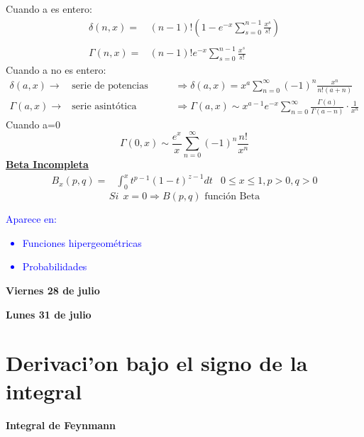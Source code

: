 \documentclass{article}
\theoremstyle{definition}
\begin{document}
Cuando a es entero:
\[
\begin{array}{rl}
	\delta (n,x)=& (n-1)!\left(1-e^{-x}\sum^{n-1}_{s=0}\frac{x^s}{s!}\right)\\
	\\
	\Gamma (n,x)=&(n-1)!e^{-x}\sum^{n-1}_{s=0}\frac{x^s}{s!}
\end{array}
\]
Cuando a no es entero:
\[
\begin{array}{rll}
	\delta (a,x)\rightarrow & \text{serie de potencias para x pequeno} &\Rightarrow \delta (a,x)=x^a\sum^{\infty}_{n=0}(-1)^n\frac{x^n}{n!(a+n)}\\
	\Gamma (a,x)\rightarrow & \text{serie asintótica} &\Rightarrow \Gamma (a,x)\sim x^{a-1}e^{-x}\sum^{\infty}_{n=0}\frac{\Gamma (a)}{\Gamma (a-n)}\cdot\frac{1}{x^n}
\end{array}
\]
Cuando a=0
\[\Gamma (0,x)\sim \frac{e^x}{x}\sum^{\infty}_{n=0}(-1)^n \frac{n!}{x^n}\]
\textbf{\underline{Beta Incompleta}}
\[
\begin{array}{rlr}
	B_x (p,q)=&\int^{x}_0t^{p-1}(1-t)^{z-1}dt
	& 0\leq x\leq 1,p>0,q>0
\end{array}
\]
\[Si\ \ x=0\Rightarrow B(p,q) \text{  función Beta}\]
\textcolor{blue}{Aparece en:
\begin{itemize}
	\item Funciones hipergeométricas
	\item Probabilidades
\end{itemize}}

\newpage
\textbf{Viernes 28 de julio}

\newpage
\textbf{Lunes 31 de julio}
\section*{Derivaci'on bajo el signo de la integral}
\textbf{Integral de Feynmann}
\end{document}
